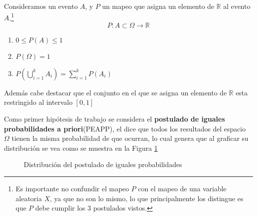 \begin{tcolorbox}[colback=mycafeF!5!white,colframe=mycafeF,title=\textbf{Axiomas de la probabilidad}]
Consideramos un evento $A$, y $P$ un mapeo que asigna un elemento de $\mathbb{R}$ al evento $A$.\footnote{Es importante no confundir el mapeo $P$ con el mapeo de una variable aleatoria $X$, ya que no son lo mismo, lo que principalmente los distingue es que $P$ debe cumplir los 3 postulados vistos.}
\begin{equation*}
    P:A\subset \Omega \rightarrow\mathbb{R}
\end{equation*}

\begin{enumerate}
    \item $0\leq P(A)\leq 1$
    \item $P(\Omega) = 1$
    \item $P(\bigcup_{i=1}^k A_i) = \sum_{i=1}^kP(A_i)$
\end{enumerate}

Además cabe destacar que el conjunto en el que se asigna un elemento de $\mathbb{R}$ esta restringido al intervalo $[0,1]$
\label{eq:AxiomasProba}
\end{tcolorbox}

Como primer hipótesis de trabajo se considera el \textbf{postulado de iguales probabilidades a priori}(PEAPP), el dice que todos los resultados del espacio $\Omega$ tienen la misma probabilidad de que ocurran, lo cual genera que al graficar su distribución se vea como se muestra en la Figura \ref{fig:PEAPP}
\begin{figure}[ht]
    \centering
{}
\caption{Distribución del postulado de iguales probabilidades}
\label{fig:PEAPP}
\end{figure}

